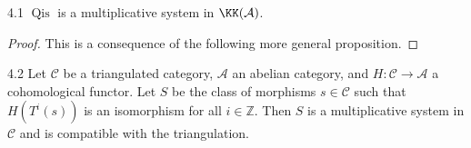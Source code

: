 \begin{bookproposition}{4.1}\label{prop:1.4.1}
	$\operatorname{Qis}$
is a multiplicative system in $\KK(\mathcal{A})$.

\end{bookproposition}
\begin{proof}

This is a consequence of the following more general proposition.
\end{proof}
\begin{bookproposition}{4.2}\label{prop:1.4.2}
Let $\mathcal{C}$ be a triangulated category, $\mathcal{A}$ an abelian category, and $H\colon\mathcal{C}\to\mathcal{A}$ a cohomological functor. Let $S$ be the class of morphisms $s\in\mathcal{C}$ such that $H(T^i(s))$ is an isomorphism for all $i\in\mathbb{Z}$. Then $S$ is a multiplicative system in $\mathcal{C}$ and is compatible with the triangulation.
\end{bookproposition}

